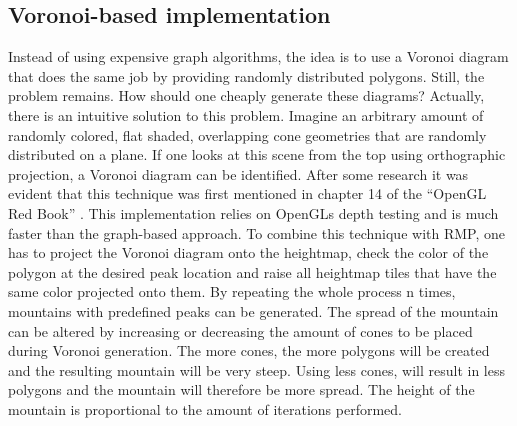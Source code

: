 \documentclass[11pt,a4paper,twoside,openright]{report}
\begin{document}
\subsection{Voronoi-based implementation}
\label{subsec:voronoibasedimpl}
Instead of using expensive graph algorithms, the idea is to use a Voronoi diagram that does the same job by providing randomly distributed polygons. Still, the problem remains. How should one cheaply generate these diagrams? Actually, there is an intuitive solution to this problem. Imagine an arbitrary amount of randomly colored, flat shaded, overlapping cone geometries that are randomly distributed on a plane. If one looks at this scene from the top using orthographic projection, a Voronoi diagram can be identified. After some research it was evident that this technique was first mentioned in chapter 14 of the ``OpenGL Red Book'' \cite{Woo:1999:OPG:554539}. This implementation relies on OpenGLs depth testing and is much faster than the graph-based approach. To combine this technique with RMP, one has to project the Voronoi diagram onto the heightmap, check the color of the polygon at the desired peak location and raise all heightmap tiles that have the same color projected onto them. By repeating the whole process n times, mountains with predefined peaks can be generated. The spread of the mountain can be altered by increasing or decreasing the amount of cones to be placed during Voronoi generation. The more cones, the more polygons will be created and the resulting mountain will be very steep. Using less cones, will result in less polygons and the mountain will therefore be more spread. The height of the mountain is proportional to the amount of iterations performed.
\end{document}
